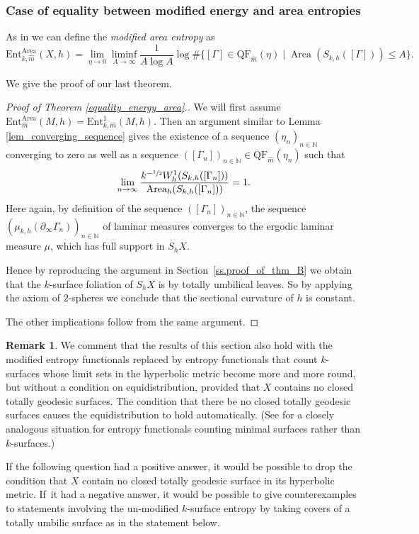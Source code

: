 \documentclass[10pt]{amsart}
\newcommand{\ksurface}{$k$\nobreakdash-surface\xspace}
\newcommand{\ksurfaces}{$k$\nobreakdash-surfaces\xspace}
\theoremstyle{plain}
\theoremstyle{definition}
\newtheorem{remark}[theorem]{Remark}
\newcommand{\Ent}{\mathrm{Ent}}
\newcommand{\QF}{\mathrm{QF}}
\newcommand{\bord}{\partial_{\infty}}
\DeclareMathOperator{\Area}{Area}
\begin{document}
\subsubsection{Case of equality between modified energy and area entropies} \label{sss.equality_modified_entropies}

As in \cite{ALS,MN_currents} we can define the \emph{modified area entropy} as
\begin{equation*}
\Ent^{\Area}_{k,\hat m}(X,h)=\lim_{\eta\to 0}\liminf_{A\to\infty}\frac{1}{A\log A}\log\#\bigl\{[\Gamma]\in\QF_{\hat m}(\eta)\mid \Area(S_{k,h}([\Gamma]))\leq A\bigr\}.
\end{equation*}

We give the proof of our last theorem.

\begin{proof}[Proof of Theorem \ref{equality_energy_area}.]
We will first assume $\Ent^{\Area}_{\hat m}(M,h)=\Ent^{1}_{k,\hat m}(M,h)$. Then an argument similar to Lemma \ref{lem_converging_sequence} gives the existence of a sequence $(\eta_n)_{n\in\mathbb{N}}$ converging to zero as well as a sequence $([\Gamma_n])_{n\in\mathbb{N}}\in\QF_{\hat m}(\eta_n)$ such that
\begin{equation*}
\lim_{n\to\infty}\frac{k^{-\sfrac{1}{2}}W^{1}_{h}(S_{k,h}([\Gamma_n]))}{\Area_h(S_{k,h}([\Gamma_n]))}=1.
\end{equation*}
Here again, by definition of the sequence $([\Gamma_n])_{n\in\mathbb{N}}$, the sequence $(\mu_{k,h}(\bord \Gamma_n))_{n\in\mathbb{N}}$ of laminar measures converges to the ergodic laminar measure $\mu$, which has full support in $S_hX$.

Hence by reproducing the argument in Section~\ref{ss.proof_of_thm_B} we obtain that the \ksurface foliation of $S_hX$ is by totally umbilical leaves. So by applying the axiom of $2$-spheres we conclude that the sectional curvature of $h$ is constant.

The other implications follow from the same argument.
\end{proof}

\begin{remark} \label{remarkattheend}
We comment that the results of this section also hold with the modified entropy functionals replaced by entropy functionals that count \ksurfaces whose limit sets in the hyperbolic metric become more and more round, but without a condition on equidistribution, provided that $X$ contains no closed totally geodesic surfaces. The condition that there be no closed totally geodesic surfaces causes the equidistribution to hold automatically. (See \cite{MN_currents} for a closely analogous situation for entropy functionals counting minimal surfaces rather than \ksurfaces.)

If the following question had a positive answer, it would be possible to drop the condition that $X$ contain no closed totally geodesic surface in its hyperbolic metric. If~it had a negative answer, it would be possible to give counterexamples to statements involving the un-modified \ksurface entropy by taking covers of a totally umbilic surface as in the statement below.
\end{remark}
\end{document}
